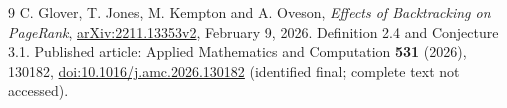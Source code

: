 \documentclass[11pt]{article}
\begin{document}
\begin{thebibliography}{9}
 C. Glover, T. Jones, M. Kempton and A. Oveson,
\emph{Effects of Backtracking on PageRank},
\href{https://arxiv.org/abs/2211.13353}{arXiv:2211.13353v2},
February 9, 2026. Definition 2.4 and Conjecture 3.1.
Published article: Applied Mathematics and Computation
\textbf{531} (2026), 130182,
\href{https://doi.org/10.1016/j.amc.2026.130182}{doi:10.1016/j.amc.2026.130182}
(identified final; complete text not accessed).
\end{thebibliography}
\end{document}
